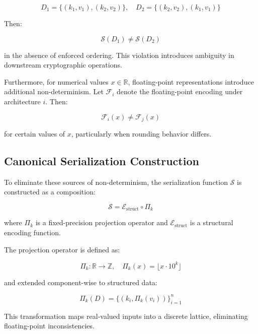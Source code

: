\begin{equation}
D_1 = \{(k_1, v_1), (k_2, v_2)\}, \quad D_2 = \{(k_2, v_2), (k_1, v_1)\}
\end{equation}

Then:

\begin{equation}
\mathcal{S}(D_1) \neq \mathcal{S}(D_2)
\end{equation}

in the absence of enforced ordering. This violation introduces ambiguity in downstream cryptographic operations.

Furthermore, for numerical values $x \in \mathbb{R}$, floating-point representations introduce additional non-determinism. Let $\mathcal{F}_i$ denote the floating-point encoding under architecture $i$. Then:

\begin{equation}
\mathcal{F}_i(x) \neq \mathcal{F}_j(x)
\end{equation}

for certain values of $x$, particularly when rounding behavior differs.

\subsection{Canonical Serialization Construction}

To eliminate these sources of non-determinism, the serialization function $\mathcal{S}$ is constructed as a composition:

\begin{equation}
\mathcal{S} = \mathcal{E}_{\text{struct}} \circ \Pi_k
\end{equation}

where $\Pi_k$ is a fixed-precision projection operator and $\mathcal{E}_{\text{struct}}$ is a structural encoding function.

The projection operator is defined as:

\begin{equation}
\Pi_k: \mathbb{R} \rightarrow \mathbb{Z}, \quad \Pi_k(x) = \lfloor x \cdot 10^k \rfloor
\end{equation}

and extended component-wise to structured data:

\begin{equation}
\Pi_k(D) = \{(k_i, \Pi_k(v_i))\}_{i=1}^{n}
\end{equation}

This transformation maps real-valued inputs into a discrete lattice, eliminating floating-point inconsistencies.

